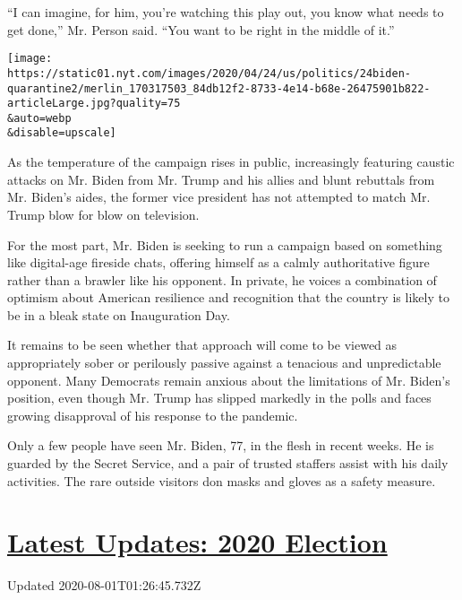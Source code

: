 ``I can imagine, for him, you're watching this play out, you know what
needs to get done,'' Mr. Person said. ``You want to be right in the
middle of it.''

\texttt{[image: https://static01.nyt.com/images/2020/04/24/us/politics/24biden-quarantine2/merlin\_170317503\_84db12f2-8733-4e14-b68e-26475901b822-articleLarge.jpg?quality=75\\\&auto=webp\\\&disable=upscale]}

As the temperature of the campaign rises in public, increasingly
featuring caustic attacks on Mr. Biden from Mr. Trump and his allies and
blunt rebuttals from Mr. Biden's aides, the former vice president has
not attempted to match Mr. Trump blow for blow on television.

For the most part, Mr. Biden is seeking to run a campaign based on
something like digital-age fireside chats, offering himself as a calmly
authoritative figure rather than a brawler like his opponent. In
private, he voices a combination of optimism about American resilience
and recognition that the country is likely to be in a bleak state on
Inauguration Day.

It remains to be seen whether that approach will come to be viewed as
appropriately sober or perilously passive against a tenacious and
unpredictable opponent. Many Democrats remain anxious about the
limitations of Mr. Biden's position, even though Mr. Trump has slipped
markedly in the polls and faces growing disapproval of his response to
the pandemic.

Only a few people have seen Mr. Biden, 77, in the flesh in recent weeks.
He is guarded by the Secret Service, and a pair of trusted staffers
assist with his daily activities. The rare outside visitors don masks
and gloves as a safety measure.

\hypertarget{latest-updates-2020-election}{%
\section{\texorpdfstring{\href{https://www.nytimes.com/2020/07/31/us/elections/biden-vs-trump.html?action=click\&pgtype=Article\&state=default\&region=MAIN_CONTENT_1\&context=storylines_live_updates}{Latest
Updates: 2020
Election}}{Latest Updates: 2020 Election}}\label{latest-updates-2020-election}}

Updated 2020-08-01T01:26:45.732Z

